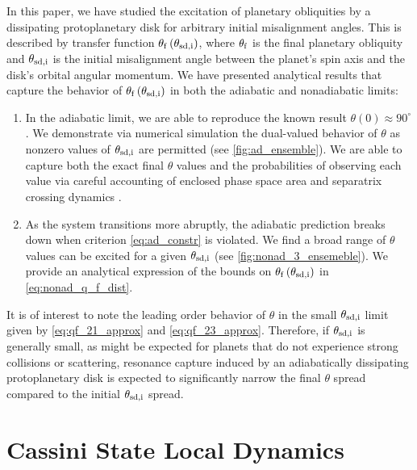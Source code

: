 \documentclass[
        fleqn,
        usenatbib,
        referee,
    ]{mnras}
\newcommand*{\p}[1]{\left(#1\right)}
\begin{document}
In this paper, we have studied the excitation of planetary obliquities by a
dissipating protoplanetary disk for arbitrary initial misalignment angles. This
is described by transfer function $\theta_{\rm f}\p{\theta_{\rm sd, i}}$, where
$\theta_{\rm f}$ is the final planetary obliquity and $\theta_{\rm sd, i}$ is
the initial misalignment angle between the planet's spin axis and the disk's
orbital angular momentum. We have presented analytical results that capture the
behavior of $\theta_{\rm f}\p{\theta_{\rm sd, i}}$ in both the adiabatic and
nonadiabatic
limits:
\begin{enumerate}
    \item In the adiabatic limit, we are able to reproduce the known result
        $\theta(0) \approx 90^\circ$ \citep{millholland_disk}. We demonstrate
        via numerical simulation the dual-valued behavior of $\theta$ as nonzero
        values of $\theta_{\rm sd, i}$ are permitted (see
        \autoref{fig:ad_ensemble}). We are able to capture both the exact final
        $\theta$ values and the probabilities of observing each value via
        careful accounting of enclosed phase space area and separatrix crossing
        dynamics \citep{henrard1982,henrard1987}.

    \item As the system transitions more abruptly, the adiabatic prediction
        breaks down when criterion \autoref{eq:ad_constr} is violated. We find a
        broad range of $\theta$ values can be excited for a given $\theta_{\rm
        sd, i}$ (see \autoref{fig:nonad_3_ensemeble}). We provide an analytical
        expression of the bounds on $\theta_{\rm f}\p{\theta_{\rm sd, i}}$ in
        \autoref{eq:nonad_q_f_dist}.
\end{enumerate}

It is of interest to note the leading order behavior of $\theta$ in the small
$\theta_{\rm sd, i}$ limit given by \autoref{eq:qf_21_approx} and
\autoref{eq:qf_23_approx}. Therefore, if $\theta_{\rm sd, i}$ is generally
small, as might be expected for planets that do not experience strong collisions
or scattering, resonance capture induced by an adiabatically dissipating
protoplanetary disk is expected to significantly narrow the final $\theta$
spread compared to the initial $\theta_{\rm sd, i}$ spread.




\appendix

\section{Cassini State Local Dynamics}\label{s:local_dynamics}
\end{document}
